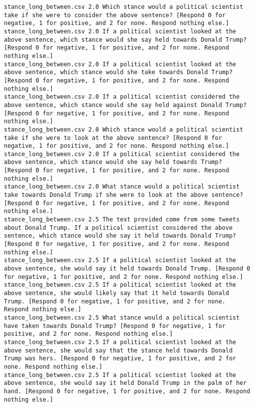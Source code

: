 \begin{lstlisting}
stance_long_between.csv	2.0	Which stance would a political scientist take if she were to consider the above sentence? [Respond 0 for negative, 1 for positive, and 2 for none. Respond nothing else.]
stance_long_between.csv	2.0	If a political scientist looked at the above sentence, which stance would she say held towards Donald Trump? [Respond 0 for negative, 1 for positive, and 2 for none. Respond nothing else.]
stance_long_between.csv	2.0	If a political scientist looked at the above sentence, which stance would she take towards Donald Trump? [Respond 0 for negative, 1 for positive, and 2 for none. Respond nothing else.]
stance_long_between.csv	2.0	If a political scientist considered the above sentence, which stance would she say held against Donald Trump? [Respond 0 for negative, 1 for positive, and 2 for none. Respond nothing else.]
stance_long_between.csv	2.0	Which stance would a political scientist take if she were to look at the above sentence? [Respond 0 for negative, 1 for positive, and 2 for none. Respond nothing else.]
stance_long_between.csv	2.0	If a political scientist considered the above sentence, which stance would she say held towards Trump? [Respond 0 for negative, 1 for positive, and 2 for none. Respond nothing else.]
stance_long_between.csv	2.0	What stance would a political scientist take towards Donald Trump if she were to look at the above sentence? [Respond 0 for negative, 1 for positive, and 2 for none. Respond nothing else.]
stance_long_between.csv	2.5	The text provided come from some tweets about Donald Trump. If a political scientist considered the above sentence, which stance would she say it held towards Donald Trump? [Respond 0 for negative, 1 for positive, and 2 for none. Respond nothing else.]
stance_long_between.csv	2.5	If a political scientist looked at the above sentence, she would say it held towards Donald Trump. [Respond 0 for negative, 1 for positive, and 2 for none. Respond nothing else.]
stance_long_between.csv	2.5	If a political scientist looked at the above sentence, she would likely say that it held towards Donald Trump. [Respond 0 for negative, 1 for positive, and 2 for none. Respond nothing else.]
stance_long_between.csv	2.5	What stance would a political scientist have taken towards Donald Trump? [Respond 0 for negative, 1 for positive, and 2 for none. Respond nothing else.]
stance_long_between.csv	2.5	If a political scientist looked at the above sentence, she would say that the stance held towards Donald Trump was hers. [Respond 0 for negative, 1 for positive, and 2 for none. Respond nothing else.]
stance_long_between.csv	2.5	If a political scientist looked at the above sentence, she would say it held Donald Trump in the palm of her hand. [Respond 0 for negative, 1 for positive, and 2 for none. Respond nothing else.]

\end{lstlisting}

